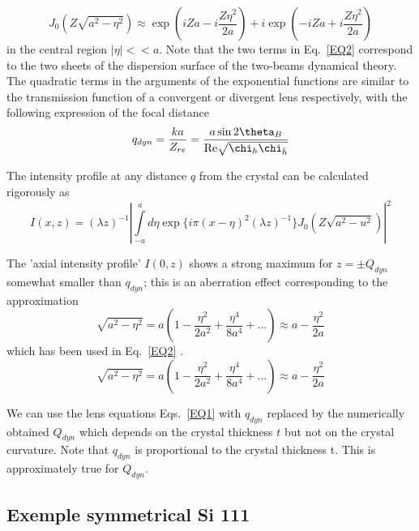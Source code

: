 \documentclass{iucr}              %
\begin{document}
\begin{equation}
\label{EQ2}
J_0(Z\sqrt {{a^2} - {\eta ^2}} ) \approx \exp (iZa - i\frac{{Z{\eta ^2}}}{{2a}}) + i\exp ( - iZa + i\frac{{Z{\eta ^2}}}{{2a}})
\end{equation}
in the central region $\left| \eta  \right| <  < a$. Note that the two terms in Eq.~\ref{EQ2} correspond to the two sheets of the dispersion surface of the two-beams dynamical theory. The quadratic terms in the arguments of the exponential functions are similar to the transmission function of a convergent or divergent lens respectively, with the following expression of the focal distance
\begin{equation}
\label{EQ3}
{q_{dyn}} = \frac{{ka}}{{{Z_{re}}}} = \frac{{a\sin 2{\theta _B}}}{{{\mathop{\rm Re}\nolimits} \sqrt {{\chi _h}{\chi _{\bar h}}} }}
\end{equation}

The intensity profile at any distance $q$ from the crystal can be calculated rigorously as 
\begin{equation}
I(x,z) = {(\lambda z)^{ - 1}}{\left| {\int\limits_{ - a}^a {d\eta \exp \{ i\pi {{(x - \eta )}^2}} {{(\lambda z)}^{ - 1}}\} {J_0}(Z\sqrt {{a^2} - {u^2}} )} \right|^2}
\end{equation}

The 'axial intensity profile'  $I(0,z)$  shows a strong maximum for  $z =  \pm {Q_{dyn}}$  somewhat smaller  than
${q_{dyn}}$; this is an aberration effect corresponding to the approximation
\begin{equation}
\sqrt {{a^2} - {\eta ^2}}  = a(1 - \frac{{{\eta ^2}}}{{2{a^2}}} + \frac{{{\eta ^4}}}{{8{a^4}}} + ...) \approx a - \frac{{{\eta ^2}}}{{2a}}
\end{equation}
which has been used in Eq.~\ref{EQ2} .
\begin{equation}
\sqrt {{a^2} - {\eta ^2}}  = a(1 - \frac{{{\eta ^2}}}{{2{a^2}}} + \frac{{{\eta ^4}}}{{8{a^4}}} + ...) \approx a - \frac{{{\eta ^2}}}{{2a}}
\end{equation}

We can use the lens equations Eqs.~\ref{EQ1} with  ${q_{dyn}}$ replaced by the numerically obtained  ${Q_{dyn}}$ which depends on the crystal thickness $t$ but not on the crystal curvature. Note that  ${q_{dyn}}$  is proportional to the crystal thickness t. This is approximately true for ${Q_{dyn}}$. 

\subsection{Exemple  symmetrical Si 111}
\end{document}
